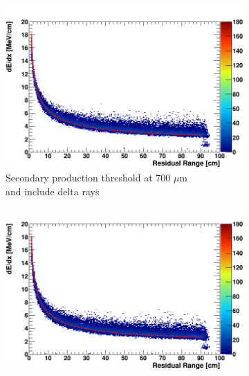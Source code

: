 \begin{figure}[ht!]
        \begin{subfigure}[b]{0.495\textwidth}   
            \centering 
            \includegraphics[width=\textwidth]{derr_proton_delta_700um}
            \caption{Secondary production threshold at 700 $\mu$m \\ and include delta rays}%
            \label{fig:derr_proton_delta_700}
        \end{subfigure}
        \hfill
        \begin{subfigure}[b]{0.495\textwidth}   
            \centering 
            \includegraphics[width=\textwidth]{derr_proton_delta_1um}

\end{subfigure}
\end{figure}
